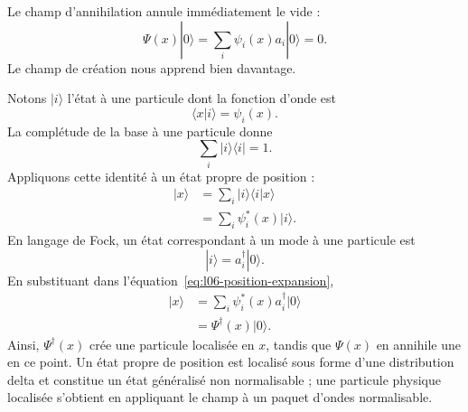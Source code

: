 Le champ d’annihilation annule immédiatement le vide :
\begin{equation}
\Psi(x)|0\rangle
=\sum_i\psi_i(x)a_i|0\rangle
=0.
\label{eq:l06-field-kills-vacuum}
\end{equation}
Le champ de création nous apprend bien davantage.

Notons \(|i\rangle\) l’état à une particule dont la fonction d’onde est
\begin{equation}
\langle x|i\rangle=\psi_i(x).
\end{equation}
La complétude de la base à une particule donne
\begin{equation}
\sum_i|i\rangle\langle i|=1.
\label{eq:l06-completeness}
\end{equation}
Appliquons cette identité à un état propre de position :
\begin{align}
|x\rangle
&=\sum_i|i\rangle\langle i|x\rangle \\
&=\sum_i\psi_i^*(x)|i\rangle.
\label{eq:l06-position-expansion}
\end{align}
En langage de Fock, un état correspondant à un mode à une particule est
\begin{equation}
|i\rangle=a_i^\dagger|0\rangle.
\end{equation}
En substituant dans l’équation~\eqref{eq:l06-position-expansion},
\begin{align}
|x\rangle
&=\sum_i\psi_i^*(x)a_i^\dagger|0\rangle \\
&=\Psi^\dagger(x)|0\rangle.
\label{eq:l06-local-creation}
\end{align}
Ainsi, \(\Psi^\dagger(x)\) crée une particule localisée en \(x\), tandis que \(\Psi(x)\) en annihile une en ce point. Un état propre de position est localisé sous forme d’une distribution delta et constitue un état généralisé non normalisable ; une particule physique localisée s’obtient en appliquant le champ à un paquet d’ondes normalisable.

\begin{classroomqa}\end{classroomqa}

